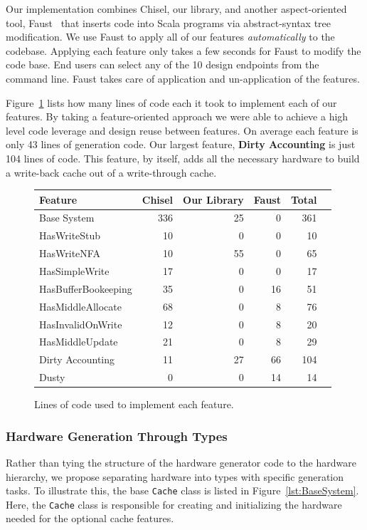 \documentclass[conference]{IEEEtran}
\begin{document}
Our implementation combines Chisel, our library, and another aspect-oriented tool, Faust~\cite{Deters:21} that inserts code into Scala programs via abstract-syntax tree modification. We use Faust to apply all of our features \emph{automatically} to the \Riscvmini{} codebase. Applying each feature only takes a few seconds for Faust to modify the code base. End users can select any of the 10 design endpoints from the command line. Faust takes care of application and un-application of the features.

Figure~\ref{fig:LOC} lists how many lines of code each it took to implement each of our features. By taking a feature-oriented approach we were able to achieve a high level code leverage and design reuse between features. On average each feature is only 43 lines of generation code. Our largest feature, \textbf{Dirty Accounting} is just 104 lines of code. This feature, by itself, adds all the necessary hardware to build a write-back cache out of a write-through cache.

\begin{figure}[ht]
    \centering
\scriptsize
\begin{tabular}{lrrrrr}\toprule
Feature &Chisel &Our Library &Faust &Total \\\midrule
Base System &336 &25 &0 &361 \\
HasWriteStub &10 &0 &0 &10 \\
HasWriteNFA &10 &55 &0 &65 \\
HasSimpleWrite &17 &0 &0 &17 \\
HasBufferBookeeping &35 &0 &16 &51 \\
HasMiddleAllocate &68 &0 &8 &76 \\
HasInvalidOnWrite &12 &0 &8 &20 \\
HasMiddleUpdate &21 &0 &8 &29 \\
Dirty Accounting &11 &27 &66 &104 \\
Dusty &0 &0 &14 &14 \\
\bottomrule
\end{tabular}
    \caption{Lines of code used to implement each feature.}
    \label{fig:LOC}
\end{figure}

\subsubsection{Hardware Generation Through Types}\label{sec:types}
Rather than tying the structure of the hardware generator code to the hardware hierarchy, we propose separating hardware into types with specific generation tasks. To illustrate this, the base \texttt{Cache} class is listed in Figure~\ref{lst:BaseSystem}. Here, the \texttt{Cache} class is responsible for creating and initializing the hardware needed for the optional cache features. 
\end{document}
